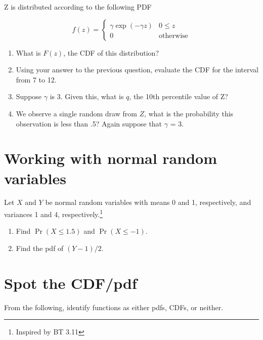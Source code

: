 \documentclass[
]{article}
\begin{document}
Z is distributed according to the following PDF

\[
f(z) = \begin{cases}
\gamma \exp(-\gamma z) &  0 \le z \\
0 & \text{otherwise}
\end{cases}
\]

\begin{enumerate}
\def\labelenumi{\alph{enumi}.}
\item
  What is \(F(z)\), the CDF of this distribution?
\item
  Using your answer to the previous question, evaluate the CDF for the
  interval from 7 to 12.
\item
  Suppose \(\gamma\) is 3. Given this, what is \(q\), the 10th
  percentile value of Z?
\item
  We observe a single random draw from \(Z\), what is the probability
  this observation is less than .5? Again suppose that \(\gamma\) = 3.
\end{enumerate}

\section{Working with normal random
variables}\label{working-with-normal-random-variables}

Let \(X\) and \(Y\) be normal random variables with means 0 and 1,
respectively, and variances 1 and 4, respectively.\footnote{Inspired by
  BT 3.11}

\begin{enumerate}
\def\labelenumi{\alph{enumi}.}
\item
  Find \(\Pr(X \leq 1.5)\) and \(\Pr(X \leq -1)\).
\item
  Find the pdf of \((Y - 1) / 2\).
\end{enumerate}

\section{Spot the CDF/pdf}\label{spot-the-cdfpdf}

From the following, identify functions as either pdfs, CDFs, or neither.
\end{document}
